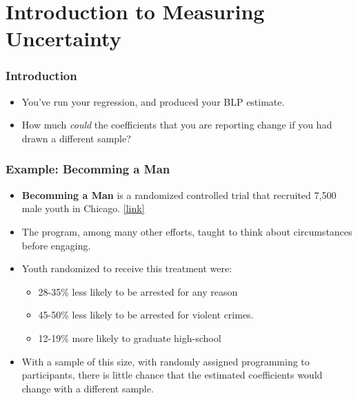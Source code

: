 \documentclass[12pt, block=fill]{beamer}
\begin{document}
\section{Introduction to Measuring Uncertainty} 

\begin{frame} 
  \frametitle{Introduction}
  \begin{itemize}
    \item You've run your regression, and produced your BLP estimate.
    \item How much \textit{could} the coefficients that you are reporting change if you had drawn a different sample?
  \end{itemize}
\end{frame}

\begin{frame}
  \frametitle{Example: Becomming a Man}
  \begin{itemize}
    \item \textbf{Becomming a Man} is a randomized controlled trial that recruited 7,500 male youth in Chicago. \href{https://www.nber.org/system/files/working_papers/w21178/w21178.pdf}{[link]}
    \item The program, among many other efforts, taught to think about circumstances before engaging.
    \item Youth randomized to receive this treatment were:
          \begin{itemize}
            \item 28-35\% less likely to be arrested for any reason
            \item 45-50\% less likely to be arrested for violent crimes.
            \item 12-19\% more likely to graduate high-school
          \end{itemize}
      \item With a sample of this size, with randomly assigned programming to participants, there is little chance that the estimated coefficients would change with a different sample.
  \end{itemize}
\end{frame}
\end{document}
